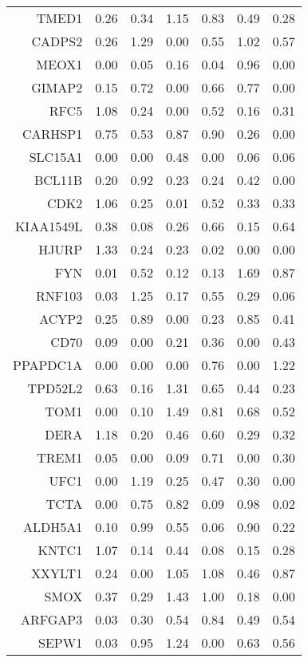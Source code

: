 \begin{longtable}{rrrrrrr}
  TMED1 & 0.26 & 0.34 & 1.15 & 0.83 & 0.49 & 0.28 \\ 
  CADPS2 & 0.26 & 1.29 & 0.00 & 0.55 & 1.02 & 0.57 \\ 
  MEOX1 & 0.00 & 0.05 & 0.16 & 0.04 & 0.96 & 0.00 \\ 
  GIMAP2 & 0.15 & 0.72 & 0.00 & 0.66 & 0.77 & 0.00 \\ 
  RFC5 & 1.08 & 0.24 & 0.00 & 0.52 & 0.16 & 0.31 \\ 
  CARHSP1 & 0.75 & 0.53 & 0.87 & 0.90 & 0.26 & 0.00 \\ 
  SLC15A1 & 0.00 & 0.00 & 0.48 & 0.00 & 0.06 & 0.06 \\ 
  BCL11B & 0.20 & 0.92 & 0.23 & 0.24 & 0.42 & 0.00 \\ 
  CDK2 & 1.06 & 0.25 & 0.01 & 0.52 & 0.33 & 0.33 \\ 
  KIAA1549L & 0.38 & 0.08 & 0.26 & 0.66 & 0.15 & 0.64 \\ 
  HJURP & 1.33 & 0.24 & 0.23 & 0.02 & 0.00 & 0.00 \\ 
  FYN & 0.01 & 0.52 & 0.12 & 0.13 & 1.69 & 0.87 \\ 
  RNF103 & 0.03 & 1.25 & 0.17 & 0.55 & 0.29 & 0.06 \\ 
  ACYP2 & 0.25 & 0.89 & 0.00 & 0.23 & 0.85 & 0.41 \\ 
  CD70 & 0.09 & 0.00 & 0.21 & 0.36 & 0.00 & 0.43 \\ 
  PPAPDC1A & 0.00 & 0.00 & 0.00 & 0.76 & 0.00 & 1.22 \\ 
  TPD52L2 & 0.63 & 0.16 & 1.31 & 0.65 & 0.44 & 0.23 \\ 
  TOM1 & 0.00 & 0.10 & 1.49 & 0.81 & 0.68 & 0.52 \\ 
  DERA & 1.18 & 0.20 & 0.46 & 0.60 & 0.29 & 0.32 \\ 
  TREM1 & 0.05 & 0.00 & 0.09 & 0.71 & 0.00 & 0.30 \\ 
  UFC1 & 0.00 & 1.19 & 0.25 & 0.47 & 0.30 & 0.00 \\ 
  TCTA & 0.00 & 0.75 & 0.82 & 0.09 & 0.98 & 0.02 \\ 
  ALDH5A1 & 0.10 & 0.99 & 0.55 & 0.06 & 0.90 & 0.22 \\ 
  KNTC1 & 1.07 & 0.14 & 0.44 & 0.08 & 0.15 & 0.28 \\ 
  XXYLT1 & 0.24 & 0.00 & 1.05 & 1.08 & 0.46 & 0.87 \\ 
  SMOX & 0.37 & 0.29 & 1.43 & 1.00 & 0.18 & 0.00 \\ 
  ARFGAP3 & 0.03 & 0.30 & 0.54 & 0.84 & 0.49 & 0.54 \\ 
  SEPW1 & 0.03 & 0.95 & 1.24 & 0.00 & 0.63 & 0.56 \\ 

\end{longtable}

